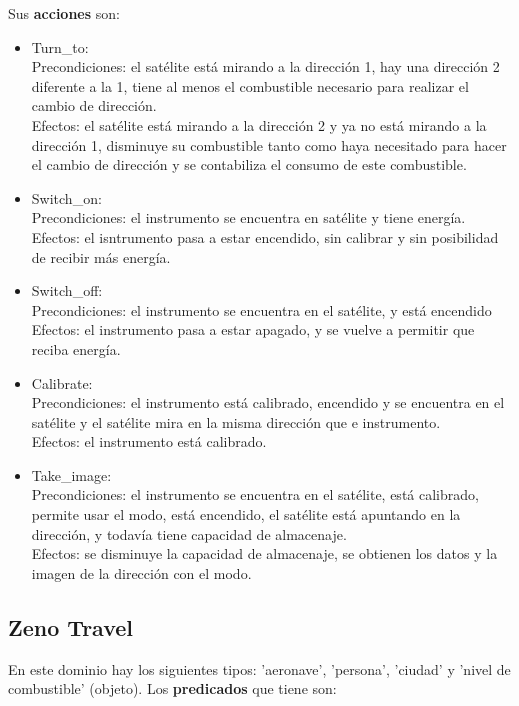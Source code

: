 \documentclass{uc3mpracticas}
\begin{document}
  Sus \textbf{acciones} son:
  \begin{itemize}
    \item Turn\_to:
    \\Precondiciones: el satélite está mirando a la dirección 1, hay una dirección 2 diferente a la 1, tiene al menos el combustible necesario para realizar el cambio de dirección.
    \\Efectos: el satélite está mirando a la dirección 2 y ya no está mirando a la dirección 1, disminuye su combustible tanto como haya necesitado para hacer el cambio de dirección y se contabiliza el consumo de este combustible.
    \item Switch\_on:
    \\Precondiciones: el instrumento se encuentra en satélite y tiene energía.
    \\Efectos: el isntrumento pasa a estar encendido, sin calibrar y sin posibilidad de recibir más energía.
    \item Switch\_off:
    \\Precondiciones: el instrumento se encuentra en el satélite, y está encendido
    \\Efectos: el instrumento pasa a estar apagado, y se vuelve a permitir que reciba energía.
    \item Calibrate:
    \\Precondiciones: el instrumento está calibrado, encendido y se encuentra en el satélite y el satélite mira en la misma dirección que e instrumento.
    \\Efectos: el instrumento está calibrado.
    \item Take\_image:
    \\Precondiciones: el instrumento se encuentra en el satélite, está calibrado, permite usar el modo, está encendido, el satélite está apuntando en la dirección, y todavía tiene capacidad de almacenaje.
    \\Efectos: se disminuye la capacidad de almacenaje, se obtienen los datos y la imagen de la dirección con el modo.
  \end{itemize}


  \subsection{Zeno Travel}

  En este dominio hay los siguientes tipos: 'aeronave', 'persona', 'ciudad' y 'nivel de combustible' (objeto). Los \textbf{predicados} que tiene son:
\end{document}

